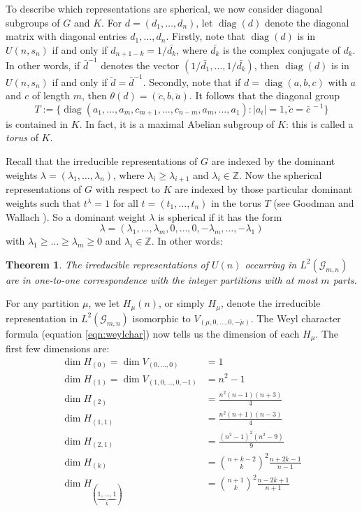\documentclass[12pt]{article}
\numberwithin{equation}{section}
\theoremstyle{plainsl}
\newtheorem{theorem}{Theorem}[section]
\newcommand\defn[1]{\textsl{#1}}
\newcommand\la{\lambda}
\renewcommand\th{\theta} %
\newcommand\ints{{\mathbb Z}}
\newcommand\re{{\mathbb R}}%
\newcommand\gras[2]{\mathcal{G}_{#1,#2}}
\newcommand\abs[1]{\left|#1\right|}
\newcommand\opk[1]{\mathop{\mathrm{#1}}\nolimits}
\newcommand\diag{\opk{diag}}
\begin{document}
To describe which representations are spherical, we now consider diagonal subgroups of $G$ and $K$. For $d = (d_1,\ldots,d_n)$, let $\diag(d)$ denote the diagonal matrix with diagonal entries $d_1,\ldots,d_n$. Firstly, note that $\diag(d)$ is in $U(n,s_n)$ if and only if $d_{n+1-k} = 1/\bar{d_k}$, where $\bar{d_k}$ is the complex conjugate of $d_k$. In other words, if $\bar{d}^{-1}$ denotes the vector $(1/\bar{d_1},\ldots,1/\bar{d_k})$, then $\diag(d)$ is in $U(n,s_n)$ if and only if $\breve{d} = \bar{d}^{-1}$. Secondly, note that if $d = \diag(a,b,c)$ with $a$ and $c$ of length $m$, then $\th(d) = (\breve{c},b,\breve{a})$. It follows that the diagonal group 
\[
T := \{\diag(a_1,\ldots,a_m,c_{m+1},\ldots,c_{n-m},a_m,\ldots,a_1): \abs{a_i} = 1, \breve{c} = \bar{c}^{\,-1}\}
\]
is contained in $K$. In fact, it is a maximal Abelian subgroup of $K$: this is called a \defn{torus} of $K$. 

Recall that the irreducible representations of $G$ are indexed by the dominant weights $\la = (\la_1,\ldots,\la_n)$, where $\la_i \geq \la_{i+1}$ and $\la_i \in \ints$. Now the spherical representations of $G$ with respect to $K$ are indexed by those particular dominant weights such that $t^{\la} = 1$ for all $t = (t_1,\ldots,t_n)$ in the torus $T$ (see Goodman and Wallach \cite[p. 540]{gw1}). So a dominant weight $\la$ is spherical if it has the form
\[
\la = (\la_1,\ldots,\la_m,0,\ldots,0,-\la_m,\ldots,-\la_1)
\]
with $\la_1 \geq \ldots \geq \la_m \geq 0$ and $\la_i \in \ints$. In other words:

\begin{theorem}
The irreducible representations of $U(n)$ occurring in $L^2(\gras{m}{n})$ are in one-to-one correspondence with the integer partitions with at most $m$ parts.
\end{theorem}

For any partition $\mu$, we let $H_\mu(n)$, or simply $H_\mu$, denote the irreducible representation in $L^2(\gras{m}{n})$ isomorphic to $V_{(\mu,0,\ldots,0,-\breve{\mu})}$. The Weyl character formula (equation \eqref{eqn:weylchar}) now tells us the dimension of each $H_\mu$. The first few dimensions are:
\begin{align*}
\dim H_{(0)} = \dim V_{(0,\ldots,0)} & = 1 \\
\dim H_{(1)} = \dim V_{(1,0,\ldots,0,-1)}& = n^2 - 1 \\
\dim H_{(2)} & = \frac{n^2(n-1)(n+3)}{4} \\
\dim H_{(1,1)} & = \frac{n^2(n+1)(n-3)}{4} \\
\dim H_{(2,1)} & = \frac{(n^2-1)^2(n^2-9)}{9} \\
\dim H_{(k)} & = \binom{n+k-2}{k}^2\frac{n+2k-1}{n-1} \\
\dim H_{(\underbrace{\scriptstyle{1,\ldots,1}}_k)} & = \binom{n+1}{k}^2\frac{n-2k+1}{n+1} 
\end{align*}
\end{document}
